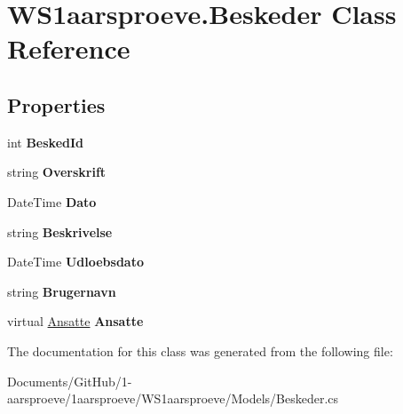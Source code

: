 \hypertarget{class_w_s1aarsproeve_1_1_beskeder}{}\section{W\+S1aarsproeve.\+Beskeder Class Reference}
\label{class_w_s1aarsproeve_1_1_beskeder}
\subsection*{Properties}
\begin{DoxyCompactItemize}
\item 
\hypertarget{class_w_s1aarsproeve_1_1_beskeder_afb5d4d4890212acdd20b9a9144acb8c9}{}int {\bfseries Besked\+Id}\label{class_w_s1aarsproeve_1_1_beskeder_afb5d4d4890212acdd20b9a9144acb8c9}

\item 
\hypertarget{class_w_s1aarsproeve_1_1_beskeder_a26ab07ec2aa00e799717e7107da39ac3}{}string {\bfseries Overskrift}\label{class_w_s1aarsproeve_1_1_beskeder_a26ab07ec2aa00e799717e7107da39ac3}

\item 
\hypertarget{class_w_s1aarsproeve_1_1_beskeder_a77960affa3d607c79ad2d36416e82990}{}Date\+Time {\bfseries Dato}\label{class_w_s1aarsproeve_1_1_beskeder_a77960affa3d607c79ad2d36416e82990}

\item 
\hypertarget{class_w_s1aarsproeve_1_1_beskeder_a30ad86441d04c5d0c5e1a605c61d6d06}{}string {\bfseries Beskrivelse}\label{class_w_s1aarsproeve_1_1_beskeder_a30ad86441d04c5d0c5e1a605c61d6d06}

\item 
\hypertarget{class_w_s1aarsproeve_1_1_beskeder_a9f84b7510fee3032f3649e9aa6283e48}{}Date\+Time {\bfseries Udloebsdato}\label{class_w_s1aarsproeve_1_1_beskeder_a9f84b7510fee3032f3649e9aa6283e48}

\item 
\hypertarget{class_w_s1aarsproeve_1_1_beskeder_ac062915cd5f28e2122bce255b63e7e74}{}string {\bfseries Brugernavn}\label{class_w_s1aarsproeve_1_1_beskeder_ac062915cd5f28e2122bce255b63e7e74}

\item 
\hypertarget{class_w_s1aarsproeve_1_1_beskeder_ad5f19abc95df1b1b1a015a5850a4e3d9}{}virtual \hyperlink{class_w_s1aarsproeve_1_1_ansatte}{Ansatte} {\bfseries Ansatte}\label{class_w_s1aarsproeve_1_1_beskeder_ad5f19abc95df1b1b1a015a5850a4e3d9}

\end{DoxyCompactItemize}


The documentation for this class was generated from the following file\+:\begin{DoxyCompactItemize}
\item 
Documents/\+Git\+Hub/1-\/aarsproeve/1aarsproeve/\+W\+S1aarsproeve/\+Models/Beskeder.\+cs\end{DoxyCompactItemize}
